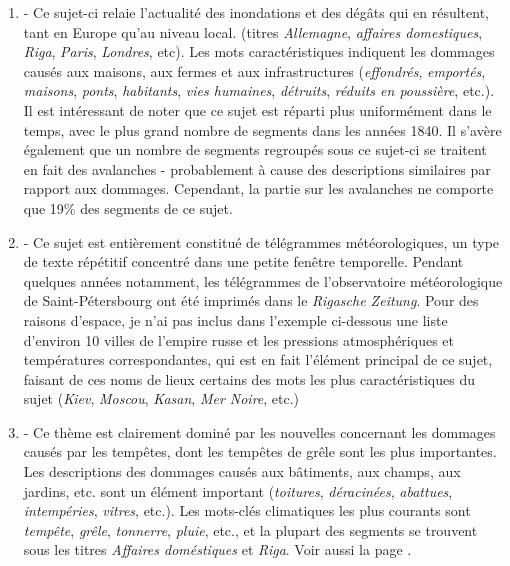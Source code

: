 \documentclass[a4paper,twoside,12pt]{article}
\begin{document}
\begin{enumerate}
    \item \textbf{} - Ce sujet-ci relaie l'actualité des inondations et des dégâts qui en résultent, tant en Europe qu'au niveau local. (titres \textit{Allemagne}, \textit{affaires domestiques}, \textit{Riga}, \textit{Paris}, \textit{Londres}, etc). Les mots caractéristiques indiquent les dommages causés aux maisons, aux fermes et aux infrastructures (\textit{effondrés}, \textit{emportés}, \textit{maisons}, \textit{ponts}, \textit{habitants}, \textit{vies humaines}, \textit{détruits}, \textit{réduits en poussière}, etc.). Il est intéressant de noter que ce sujet est réparti plus uniformément dans le temps, avec le plus grand nombre de segments dans les années 1840. Il s'avère également que un nombre de segments regroupés sous ce sujet-ci se traitent en fait des avalanches - probablement à cause des descriptions similaires par rapport aux dommages. Cependant, la partie sur les avalanches ne comporte que 19\% des segments de ce sujet.
    
    \item \textbf{} - Ce sujet est entièrement constitué de télégrammes météorologiques, un type de texte répétitif concentré dans une petite fenêtre temporelle. Pendant quelques années notamment, les télégrammes de l'observatoire météorologique de Saint-Pétersbourg ont été imprimés dans le \textit{Rigasche Zeitung}. Pour des raisons d'espace, je n'ai pas inclus dans l'exemple ci-dessous une liste d'environ 10 villes de l'empire russe et les pressions atmosphériques et températures correspondantes, qui est en fait l'élément principal de ce sujet, faisant de ces noms de lieux certains des mots les plus caractéristiques du sujet (\textit{Kiev}, \textit{Moscou}, \textit{Kasan}, \textit{Mer Noire}, etc.)

    \item \textbf{} - Ce thème est clairement dominé par les nouvelles concernant les dommages causés par les tempêtes, dont les tempêtes de grêle sont les plus importantes. Les descriptions des dommages causés aux bâtiments, aux champs, aux jardins, etc. sont un élément important (\textit{toitures}, \textit{déracinées}, \textit{abattues}, \textit{intempéries}, \textit{vitres}, etc.). Les mots-clés climatiques les plus courants sont \textit{tempête}, \textit{grêle}, \textit{tonnerre}, \textit{pluie}, etc., et la plupart des segments se trouvent sous les titres \textit{Affaires doméstiques} et \textit{Riga}. Voir aussi la page \pageref{about:hagel}.
    

\end{enumerate}
\end{document}
